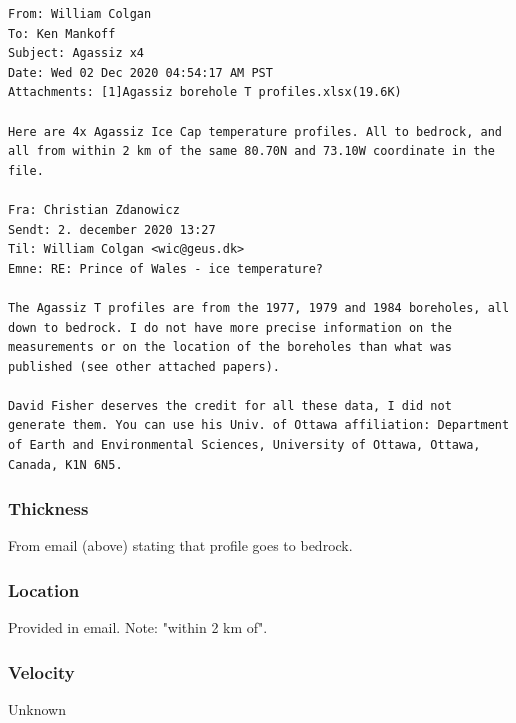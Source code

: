 \documentclass[article,a4paper,times,11pt,twoside]{article}
\begin{document}
\begin{verbatim}
From: William Colgan
To: Ken Mankoff
Subject: Agassiz x4
Date: Wed 02 Dec 2020 04:54:17 AM PST
Attachments: [1]Agassiz borehole T profiles.xlsx(19.6K)

Here are 4x Agassiz Ice Cap temperature profiles. All to bedrock, and
all from within 2 km of the same 80.70N and 73.10W coordinate in the
file.

Fra: Christian Zdanowicz
Sendt: 2. december 2020 13:27
Til: William Colgan <wic@geus.dk>
Emne: RE: Prince of Wales - ice temperature?

The Agassiz T profiles are from the 1977, 1979 and 1984 boreholes, all
down to bedrock. I do not have more precise information on the
measurements or on the location of the boreholes than what was
published (see other attached papers).

David Fisher deserves the credit for all these data, I did not
generate them. You can use his Univ. of Ottawa affiliation: Department
of Earth and Environmental Sciences, University of Ottawa, Ottawa,
Canada, K1N 6N5.
\end{verbatim}

\subsubsection{Thickness}
\label{sec:org819a562}

From email (above) stating that profile goes to bedrock.

\subsubsection{Location}
\label{sec:org0173f9d}

Provided in email. Note: "within 2 km of".

\subsubsection{Velocity}
\label{sec:org58afd4d}

Unknown
\clearpage
\end{document}
